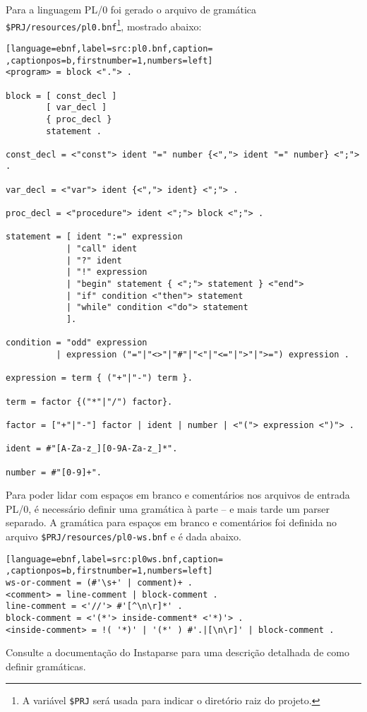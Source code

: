\documentclass{scrartcl}
\begin{document}
Para a linguagem PL/0 foi gerado o arquivo de gramática
\texttt{\$PRJ/resources/pl0.bnf}\footnote{A variável \texttt{\$PRJ} será usada para indicar o diretório raiz do projeto.}, mostrado abaixo:

\begin{lstlisting}[language=ebnf,label=src:pl0.bnf,caption= ,captionpos=b,firstnumber=1,numbers=left]
<program> = block <"."> .

block = [ const_decl ]
        [ var_decl ]
        { proc_decl }
        statement .

const_decl = <"const"> ident "=" number {<","> ident "=" number} <";"> .

var_decl = <"var"> ident {<","> ident} <";"> .

proc_decl = <"procedure"> ident <";"> block <";"> .

statement = [ ident ":=" expression
            | "call" ident 
            | "?" ident
            | "!" expression
            | "begin" statement { <";"> statement } <"end">
            | "if" condition <"then"> statement 
            | "while" condition <"do"> statement
            ].

condition = "odd" expression
          | expression ("="|"<>"|"#"|"<"|"<="|">"|">=") expression .

expression = term { ("+"|"-") term }.

term = factor {("*"|"/") factor}.

factor = ["+"|"-"] factor | ident | number | <"("> expression <")"> .

ident = #"[A-Za-z_][0-9A-Za-z_]*".

number = #"[0-9]+".
\end{lstlisting}

Para poder lidar com espaços em branco e comentários nos arquivos de entrada
PL/0, é necessário definir uma gramática à parte -- e mais tarde um parser
separado. A gramática para espaços em branco e comentários foi definida no
arquivo \texttt{\$PRJ/resources/pl0-ws.bnf} e é dada abaixo.

\begin{lstlisting}[language=ebnf,label=src:pl0ws.bnf,caption= ,captionpos=b,firstnumber=1,numbers=left]
ws-or-comment = (#'\s+' | comment)+ .
<comment> = line-comment | block-comment .
line-comment = <'//'> #'[^\n\r]*' .
block-comment = <'(*'> inside-comment* <'*)'> .
<inside-comment> = !( '*)' | '(*' ) #'.|[\n\r]' | block-comment .
\end{lstlisting}

Consulte a documentação do Instaparse para uma descrição detalhada de como
definir gramáticas.
\end{document}
